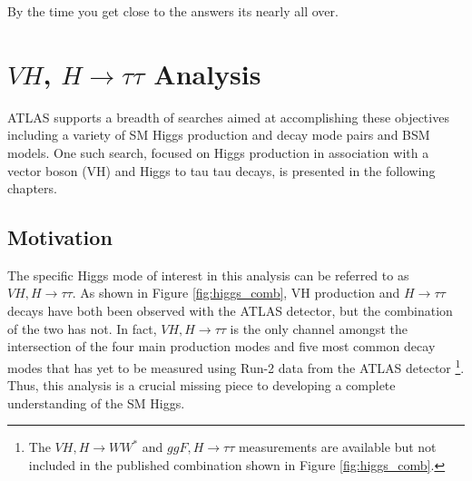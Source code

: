 \begin{savequote}[75mm]
By the time you get close to the answers its nearly all over.
\end{savequote}

\chapter{$VH$, $H\rightarrow \tau\tau$ Analysis}

 ATLAS supports a breadth of searches aimed at accomplishing these objectives including a variety of SM Higgs production and decay mode pairs and BSM models. One such search, focused on Higgs production in association with a vector boson (VH) and Higgs to tau tau decays, is presented in the following chapters.

\section{Motivation}
The specific Higgs mode of interest in this analysis can be referred to as $VH, H\rightarrow\tau\tau$. As shown in Figure \ref{fig:higgs_comb}, VH production and $H\rightarrow \tau\tau$ decays have both been observed  with the ATLAS detector, but the combination of the two has not. In fact, $VH,H\rightarrow\tau\tau$ is the only channel amongst the intersection of the four main production modes and five most common decay modes that has yet to be measured using Run-2 data from the ATLAS detector \cite{higgs_comb_paper}\footnote{The $VH,H\rightarrow WW^*$\cite{vh_hww_run2} and $ggF,H\rightarrow\tau\tau$\cite{htautau_run2} measurements are available but not included in the published combination shown in Figure \ref{fig:higgs_comb}.}. Thus, this analysis is a crucial missing piece to developing a complete understanding of the SM Higgs.\\

